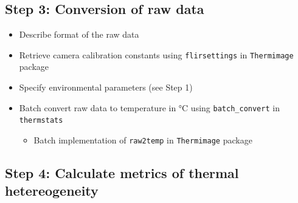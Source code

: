 \documentclass[12pt,a4paper,]{report}
\providecommand{\tightlist}{%
  \setlength{\itemsep}{0pt}\setlength{\parskip}{0pt}}
\theoremstyle{definition}
\theoremstyle{definition}
\theoremstyle{definition}
\theoremstyle{remark}
\begin{document}
\subsection{Step 3: Conversion of raw
data}\label{step-3-conversion-of-raw-data}

\begin{itemize}
\tightlist
\item
  Describe format of the raw data
\item
  Retrieve camera calibration constants using \texttt{flirsettings} in
  \texttt{Thermimage} package
\item
  Specify environmental parameters (see Step 1)
\item
  Batch convert raw data to temperature in °C using
  \texttt{batch\_convert} in \texttt{thermstats}

  \begin{itemize}
  \tightlist
  \item
    Batch implementation of \texttt{raw2temp} in \texttt{Thermimage}
    package
  \end{itemize}
\end{itemize}

\subsection{Step 4: Calculate metrics of thermal
hetereogeneity}\label{step-4-calculate-metrics-of-thermal-hetereogeneity}
\end{document}
